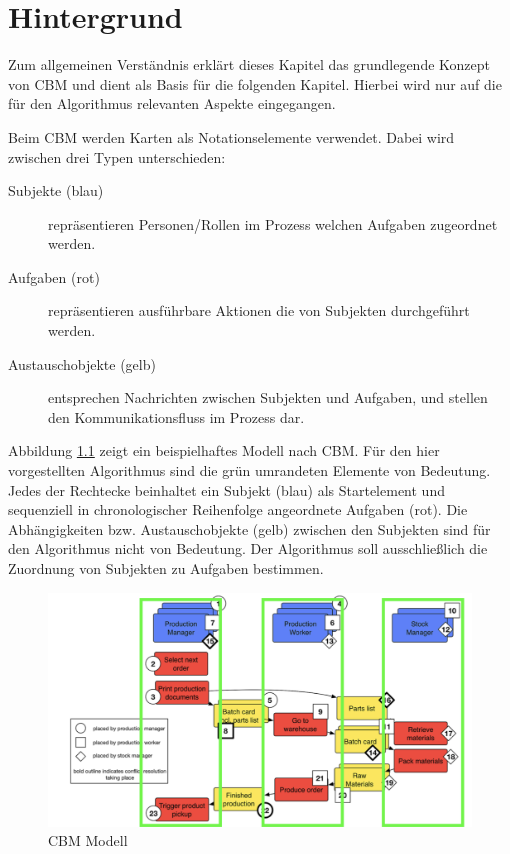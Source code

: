 %
%
% 
% 
% 

\chapter{Hintergrund} %
\label{cha:hintergrund}
Zum allgemeinen Verständnis erklärt dieses Kapitel das grundlegende Konzept von CBM und dient als Basis für die folgenden Kapitel. Hierbei wird nur auf die für den Algorithmus relevanten Aspekte eingegangen. 

Beim CBM werden Karten als Notationselemente verwendet. Dabei wird zwischen drei Typen unterschieden:
\begin{description}
	\item[Subjekte (blau)] repräsentieren Personen/Rollen im Prozess welchen Aufgaben zugeordnet werden.
	\item[Aufgaben (rot)] repräsentieren ausführbare Aktionen die von Subjekten durchgeführt werden.
	\item[Austauschobjekte (gelb)] entsprechen Nachrichten zwischen Subjekten und Aufgaben, und stellen den Kommunikationsfluss im Prozess dar.
\end{description}

Abbildung \ref{fig:cbm-grundstruktur} zeigt ein beispielhaftes Modell nach CBM. Für den hier vorgestellten Algorithmus sind die grün umrandeten Elemente von Bedeutung. Jedes der Rechtecke beinhaltet ein Subjekt (blau) als Startelement und sequenziell in chronologischer Reihenfolge angeordnete Aufgaben (rot). Die Abhängigkeiten bzw. Austauschobjekte (gelb) zwischen den Subjekten sind für den Algorithmus nicht von Bedeutung. Der Algorithmus soll ausschließlich die Zuordnung von Subjekten zu Aufgaben bestimmen.
\begin{figure}[H]
	\centering 
	\begin{minipage}[b]{0.9\textwidth} 
		\includegraphics[width=\textwidth]{figures/cbm-grundstruktur.png}
		\caption[CBM Modell]{CBM Modell \protect~\cite{oppl2016linking}}
		\label{fig:cbm-grundstruktur} 
	\end{minipage}
\end{figure}
